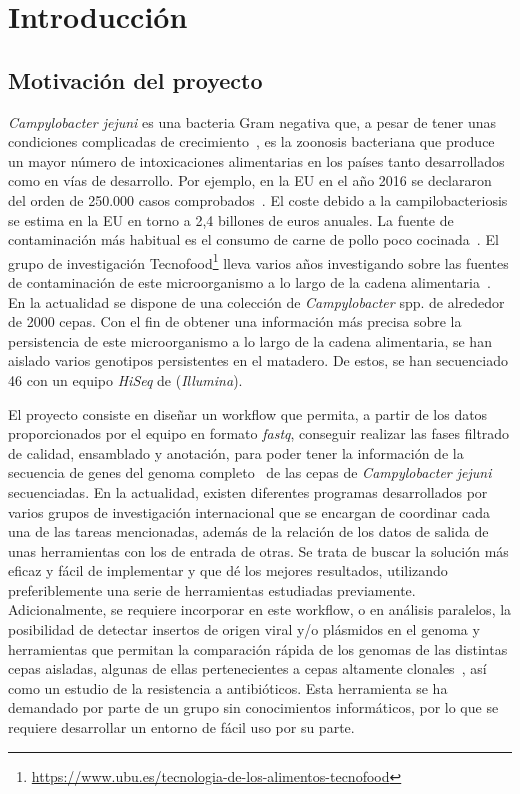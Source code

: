 \chapter{Introducción} 
\label{chap:intro}

\vspace{-0.2cm}

\section{Motivación del proyecto}

\textit{Campylobacter jejuni} es una bacteria Gram negativa que, a pesar de tener unas condiciones complicadas de crecimiento~\cite{garciasanchez2017}, es la zoonosis bacteriana que produce un mayor número de intoxicaciones alimentarias en los países tanto desarrollados como en vías de desarrollo. Por ejemplo, en la EU en el año 2016 se declararon del orden de 250.000 casos comprobados~\cite{report2016}. El coste debido a la campilobacteriosis se estima en la EU en torno a 2,4 billones de euros anuales. La fuente de contaminación más habitual es el consumo de carne de pollo poco cocinada~\cite{GarciaSanchez2018}. El grupo de investigación Tecnofood\footnote{\url{https://www.ubu.es/tecnologia-de-los-alimentos-tecnofood}} lleva varios años investigando sobre las fuentes de contaminación de este microorganismo a lo largo de la cadena alimentaria~\cite{garciasanchez2017, GarciaSanchez2018, Melero2012}. En la actualidad se dispone de una colección de \textit{Campylobacter} spp. de alrededor de 2000 cepas. Con el fin de obtener una información más precisa sobre la persistencia de este microorganismo a lo largo de la cadena alimentaria, se han aislado varios genotipos persistentes en el matadero. De estos, se han secuenciado 46 con un equipo \textit{HiSeq} de (\textit{Illumina}).

El proyecto consiste en diseñar un workflow que permita, a partir de los datos proporcionados por el equipo en formato \textit{fastq}, conseguir realizar las fases filtrado de calidad, ensamblado y anotación, para poder tener la información de la secuencia de genes del genoma completo~\cite{Clark2016, Llarena2017, Zhao2016} de las cepas de \textit{Campylobacter jejuni} secuenciadas. En la actualidad, existen diferentes programas desarrollados por varios grupos de investigación internacional que se encargan de coordinar cada una de las tareas mencionadas, además de la relación de los datos de salida de unas herramientas con los de entrada de otras. Se trata de buscar la solución más eficaz y fácil de implementar y que dé los mejores resultados, utilizando preferiblemente una serie de herramientas estudiadas previamente. Adicionalmente, se requiere incorporar en este workflow, o en análisis paralelos, la posibilidad de detectar insertos de origen viral y/o plásmidos en el genoma y herramientas que permitan la comparación rápida de los genomas de las distintas cepas aisladas, algunas de ellas pertenecientes a cepas altamente clonales~\cite{Skarp2015}, así como un estudio de la resistencia a antibióticos. Esta herramienta se ha demandado por parte de un grupo sin conocimientos informáticos, por lo que se requiere desarrollar un entorno de fácil uso por su parte.

